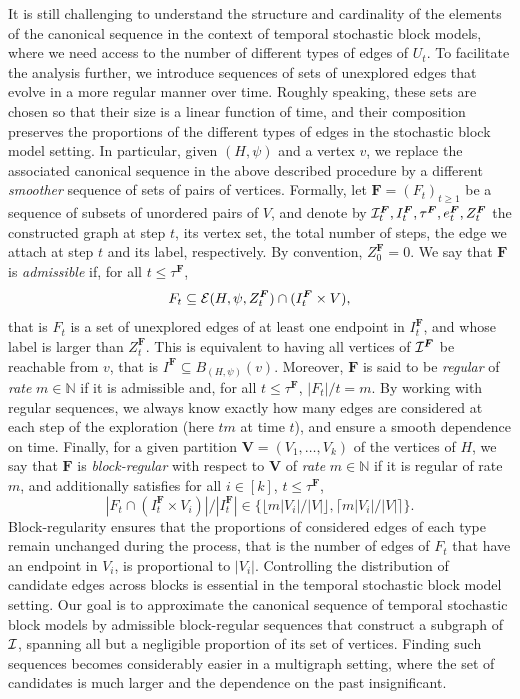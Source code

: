 \documentclass[11pt]{article}
\numberwithin{equation}{section}
\theoremstyle{definition}
\newcommand\bN{{\mathbb N}}
\newcommand\cE{{\cal{E}}}
\newcommand\cI{{\cal{I}}}
\begin{document}
It is still challenging to understand the structure and cardinality of the elements of the canonical sequence in the context of temporal stochastic block models, where we need access to the number of different types of edges of $U_t$. To facilitate the analysis further, we introduce sequences of sets of unexplored edges that evolve in a more regular manner over time. Roughly speaking, these sets are chosen so that their size is a linear function of time, and their composition preserves the proportions of the different types of edges in the stochastic block model setting. In particular, given $(H,\psi)$ and a vertex $v$, we replace the associated canonical sequence in the above described procedure by a different \emph{smoother} sequence of sets of pairs of vertices. Formally, let ${\boldsymbol{F}} = (F_t)_{t\geq 1}$ be a sequence of subsets of unordered pairs of $V$, and denote by $\cI_t^{\boldsymbol{F}}, I^{\boldsymbol{F}}_t, \tau^{\boldsymbol{F}}, e^{\boldsymbol{F}}_t, Z^{\boldsymbol{F}}_t$ the constructed graph at step $t$, its vertex set, the total number of steps, the edge we attach at step $t$ and its label, respectively. By convention, $Z^{\boldsymbol{F}}_0 = 0$. We say that $\boldsymbol{F}$ is \emph{admissible} if, for all $t\leq \tau^{\boldsymbol{F}}$,
$$F_t \subseteq \cE(H,\psi,Z^{\boldsymbol{F}}_t) \cap (I^{\boldsymbol{F}}_t \times V) ,$$
that is $F_t$ is a set of unexplored edges of at least one endpoint in $I^{\boldsymbol{F}}_t$, and whose label is larger than $Z^{\boldsymbol{F}}_{t}$. This is equivalent to having all vertices of $\cI^{\boldsymbol{F}}$ be reachable from $v$, that is $I^{\boldsymbol{F}} \subseteq B_{(H,\psi)}(v)$. Moreover, $\boldsymbol{F}$ is said to be \emph{regular} of \emph{rate} $m\in \bN$ if it is admissible and, for all $t \leq \tau^{\boldsymbol{F}}$, $|F_t| / t = m$. By working with regular sequences, we always know exactly how many edges are considered at each step of the exploration (here $tm$ at time $t$), and ensure a smooth dependence on time. Finally, for a given partition $\boldsymbol{V} = (V_1,\ldots, V_k)$ of the vertices of $H$, we say that $\boldsymbol{F}$ is \emph{block-regular} with respect to $\boldsymbol{V}$ of \emph{rate} $m\in \bN$ if it is regular of rate $m$, and additionally satisfies for all $i \in [k]$, $t \leq \tau^{\boldsymbol{F}}$, 
$$|F_t \cap (I^{\boldsymbol{F}}_t \times V_i) |/|I^{\boldsymbol{F}}_t| \in \{\lfloor m|V_i|/|V| \rfloor, \lceil m|V_i| /|V| \rceil\}.$$
Block-regularity ensures that the proportions of considered edges of each type remain unchanged during the process, that is the number of edges of $F_t$ that have an endpoint in $V_i$, is proportional to $|V_i|$. Controlling the distribution of candidate edges across blocks is essential in the temporal stochastic block model setting. Our goal is to approximate the canonical sequence of temporal stochastic block models by admissible block-regular sequences that construct a subgraph of $\cI$, spanning all but a negligible proportion of its set of vertices. Finding such sequences becomes considerably easier in a multigraph setting, where the set of candidates is much larger and the dependence on the past insignificant.  
\end{document}
